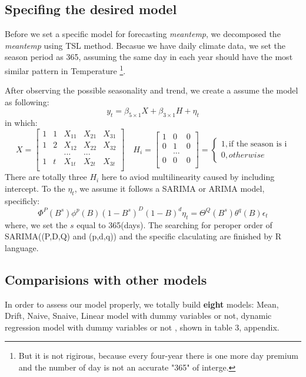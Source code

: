 \documentclass[12pt]{article}
\begin{document}
\subsection{Specifing the desired model}
Before we set a specific model for forecasting \textit{meantemp}, 
we decomposed the \textit{meantemp} using TSL method\cite{fpp3stl}. Becasue
we have daily climate data, we set the season period as 365, assuming 
the same day in each year should have the most similar pattern in Temperature
\footnote{But it is not rigirous, because every 
four-year there is one more day premium and the number of day
is not an accurate "365" of interge.}.

After observing the possible seasonality and trend, we create a assume the model as following:
\[
y_t = \beta_{5 \times 1} X + \beta_{3 \times 1} H + \eta_t
\]
in which:
\[
X = \begin{bmatrix}
    1 & 1 & X_{11} & X_{21} & X_{31}\\
    1 & 2 & X_{12} & X_{22} & X_{32}\\
    & & ... & ... &\\
    1 & t & X_{1t} & X_{2t} & X_{3t} \\
    \end{bmatrix}
\quad H_i = 
\begin{bmatrix}
    1 & 0 & 0\\
    0 & 1 & 0\\
     & ... & \\
    0 & 0 & 0 \\
    \end{bmatrix} =
\begin{cases}
    1, \text{if the season is i} \\
    0, other wise
\end{cases}
\]
There are totally three $H_i$ here to aviod multilinearity 
caused by including intercept. To the $\eta_t$, we assume it follows
a SARIMA or ARIMA model, specificly:
\[
\Phi^P(B^s) \phi^p(B) (1-B^s)^D (1-B)^d \eta_t = 
\Theta^Q(B^s) \theta^q(B) \epsilon_t
\]
where, we set the $s$ equal to 365(days). The searching for peroper order  
of SARIMA((P,D,Q) and (p,d,q)) and the specific claculating are finished
by R language.

\subsection{Comparisions with other models}
In order to assess our model properly, we totally build \textbf{eight} models: Mean, Drift,
Naive, Snaive, Linear model with dummy variables or not, dynamic regression model with dummy variables or not
, shown in table 3, appendix.
\end{document}
